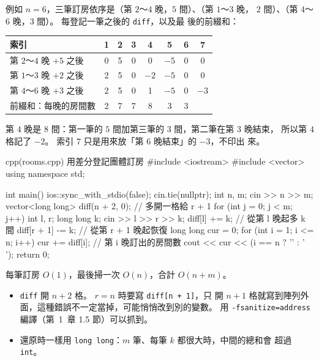 例如 $n = 6$，三筆訂房依序是（第 $2$～$4$ 晚，$5$ 間）、（第 $1$～$3$ 晚，
$2$ 間）、（第 $4$～$6$ 晚，$3$ 間）。 每登記一筆之後的 \texttt{diff}，以及最
後的前綴和：

\begin{center}
\begin{tabular}{l|ccccccc}
\toprule
索引 & 1 & 2 & 3 & 4 & 5 & 6 & 7 \\
\midrule
第 $2$～$4$ 晚 $+5$ 之後 & 0 & 5 & 0 & 0 & $-5$ & 0 & 0 \\
第 $1$～$3$ 晚 $+2$ 之後 & 2 & 5 & 0 & $-2$ & $-5$ & 0 & 0 \\
第 $4$～$6$ 晚 $+3$ 之後 & 2 & 5 & 0 & 1 & $-5$ & 0 & $-3$ \\
\midrule
前綴和：每晚的房間數 & 2 & 7 & 7 & 8 & 3 & 3 & \\
\bottomrule
\end{tabular}
\end{center}

第 $4$ 晚是 $8$ 間：第一筆的 $5$ 間加第三筆的 $3$ 間，第二筆在第 $3$ 晚結束，
所以第 $4$ 格記了 $-2$。 索引 $7$ 只是用來放「第 $6$ 晚結束」的 $-3$，不印出
來。

\begin{example}[label=ex:ps-rooms]{cpp}{(rooms.cpp) 用差分登記團體訂房}
#include <iostream>
#include <vector>
using namespace std;

int main() {
    ios::sync_with_stdio(false);
    cin.tie(nullptr);
    int n, m;
    cin >> n >> m;
    vector<long long> diff(n + 2, 0);   // 多開一格給 r + 1
    for (int j = 0; j < m; j++) {
        int l, r;
        long long k;
        cin >> l >> r >> k;
        diff[l] += k;                   // 從第 l 晚起多 k 間
        diff[r + 1] -= k;               // 從第 r + 1 晚起恢復
    }
    long long cur = 0;
    for (int i = 1; i <= n; i++) {
        cur += diff[i];                 // 第 i 晚訂出的房間數
        cout << cur << (i == n ? '\n' : ' ');
    }
    return 0;
}
\end{example}


每筆訂房 $O(1)$，最後掃一次 $O(n)$，合計 $O(n + m)$。

\begin{itemize}
\item \texttt{diff} 開 $n + 2$ 格。 $r = n$ 時要寫 \texttt{diff[n + 1]}，只
開 $n + 1$ 格就寫到陣列外面，這種錯誤不一定當掉，可能悄悄改到別的變數。 用
\texttt{-fsanitize=address} 編譯（第~1~章 1.5 節）可以抓到。
\item 還原時一樣用 \texttt{long long}：$m$ 筆、每筆 $k$ 都很大時，中間的總和會
超過 \texttt{int}。
\end{itemize}


